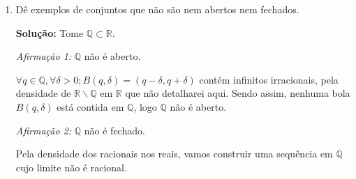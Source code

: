 \documentclass[12pt]{article}
\newcommand{\R}{\mathbb{R}}
\newcommand{\N}{\mathbb{N}}
\newcommand{\Q}{\mathbb{Q}}
\newcommand{\dps}{\displaystyle}
\begin{document}
\begin{enumerate}
Tome $a,b\in\R$ com $a<b$, e $|b-a|>2$ e $(F_n)_{n\in\N}$ família de fechados com $F_n:=[a+1/n,b-1/n]$.

\textit{Afirmação:} $\dps\bigcup_{n\in\N}F_n=(a,b)$ que não é fechado.

\textit{Prova:} Provemos primeiro que $\bigcup_{n\in\N}F_n\subseteq(a,b)$.

Se $x\in\bigcup F_n$ então $x\in F_{n_0}$ para algum $n_0\in\N$, como $a+1/n_0>a$ e $b-1/n_0$ então $F_{n_0}=[a+1/n_0,b-1/n_0]\subset(a,b)$, logo $x\in(a,b)$\footnote{A restrição do início $|b-a|>2$ é para não termos problemas no caso $n_0=1$, e garantir sempre que $a+\frac1n_0<b-\frac1n_0$}.

Agora provaremos que $(a,b)\subseteq\bigcup F_n$.

Dado $x\in(a,b)$ suponha que $x\leq(b-a)/2$, omitirei o outro caso pois a demonstração é análoga.

Sabe-se que $\exists n_0\in\N$ tal que $\frac1n_0<x-a$, assim $a+\frac1n_0<a+(x-a)=x$. Basta agora provar que $x<b-\frac1n_0$ e concluiremos que $x\in F_{n_0}\subseteq\bigcup F_n$.

\begin{align*}
	x+1/n_0&<x+(x-a)\\
	&=2x-a\\
	&\leq 2 (b-a)/2-a\\
	&=b-a+b=b
\end{align*}

Logo $x<b-1/n_0$ como queríamos demonstrar. O fato de $(a,b)$ não ser fechado segue por exemplo, da sequência $a_n=a+1/n$ que converge para $a$ porém $a\notin(a,b)$.


\item D\^e exemplos de conjuntos que n\~ao s\~ao nem abertos nem fechados.

\textbf{Solução:} Tome $\Q\subset\R$. 

\textit{Afirmação 1:} $\Q$ não é aberto.

$\forall q\in\Q,\forall\delta>0;B(q,\delta)=(q-\delta,q+\delta)$ contém infinitos irracionais, pela densidade de $\R\backslash\Q$ em $\R$ que não detalharei aqui. Sendo assim, nenhuma bola $B(q,\delta)$ está contida em $\Q$, logo $\Q$ não é aberto.

\textit{Afirmação 2:} $\Q$ não é fechado.

Pela densidade dos racionais nos reais, vamos construir uma sequência em $\Q$ cujo limite não é racional.


\end{enumerate}
\end{document}
